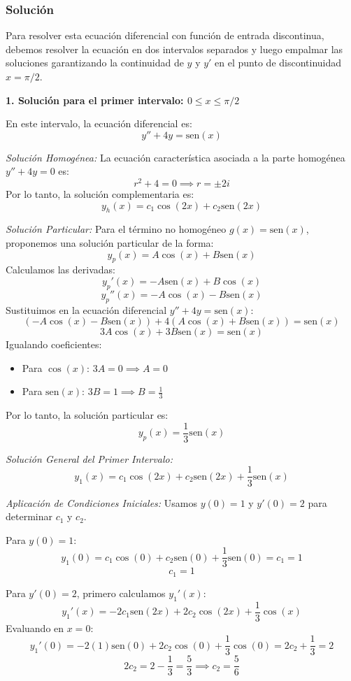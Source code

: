 \documentclass[a4paper]{article}
\begin{document}
\subsubsection{Solución}

Para resolver esta ecuación diferencial con función de entrada discontinua, debemos resolver la ecuación en dos intervalos separados y luego empalmar las soluciones garantizando la continuidad de $y$ y $y'$ en el punto de discontinuidad $x = \pi/2$.

\textbf{1. Solución para el primer intervalo: $0 \leq x \leq \pi/2$}

En este intervalo, la ecuación diferencial es:
$$
y'' + 4y = \text{sen}(x)
$$

\textit{Solución Homogénea:}
La ecuación característica asociada a la parte homogénea $y'' + 4y = 0$ es:
$$
r^2 + 4 = 0 \implies r = \pm 2i
$$
Por lo tanto, la solución complementaria es:
$$
y_h(x) = c_1 \cos(2x) + c_2 \text{sen}(2x)
$$

\textit{Solución Particular:}
Para el término no homogéneo $g(x) = \text{sen}(x)$, proponemos una solución particular de la forma:
$$
y_p(x) = A \cos(x) + B \text{sen}(x)
$$
Calculamos las derivadas:
$$
y_p'(x) = -A \text{sen}(x) + B \cos(x)
$$
$$
y_p''(x) = -A \cos(x) - B \text{sen}(x)
$$
Sustituimos en la ecuación diferencial $y'' + 4y = \text{sen}(x)$:
$$
(-A \cos(x) - B \text{sen}(x)) + 4(A \cos(x) + B \text{sen}(x)) = \text{sen}(x)
$$
$$
3A \cos(x) + 3B \text{sen}(x) = \text{sen}(x)
$$
Igualando coeficientes:
\begin{itemize}
    \item Para $\cos(x)$: $3A = 0 \implies A = 0$
    \item Para $\text{sen}(x)$: $3B = 1 \implies B = \frac{1}{3}$
\end{itemize}
Por lo tanto, la solución particular es:
$$
y_p(x) = \frac{1}{3} \text{sen}(x)
$$

\textit{Solución General del Primer Intervalo:}
$$
y_1(x) = c_1 \cos(2x) + c_2 \text{sen}(2x) + \frac{1}{3} \text{sen}(x)
$$

\textit{Aplicación de Condiciones Iniciales:}
Usamos $y(0) = 1$ y $y'(0) = 2$ para determinar $c_1$ y $c_2$.

Para $y(0) = 1$:
$$
y_1(0) = c_1 \cos(0) + c_2 \text{sen}(0) + \frac{1}{3} \text{sen}(0) = c_1 = 1
$$
$$
c_1 = 1
$$

Para $y'(0) = 2$, primero calculamos $y_1'(x)$:
$$
y_1'(x) = -2c_1 \text{sen}(2x) + 2c_2 \cos(2x) + \frac{1}{3} \cos(x)
$$
Evaluando en $x = 0$:
$$
y_1'(0) = -2(1) \text{sen}(0) + 2c_2 \cos(0) + \frac{1}{3} \cos(0) = 2c_2 + \frac{1}{3} = 2
$$
$$
2c_2 = 2 - \frac{1}{3} = \frac{5}{3} \implies c_2 = \frac{5}{6}
$$
\end{document}

